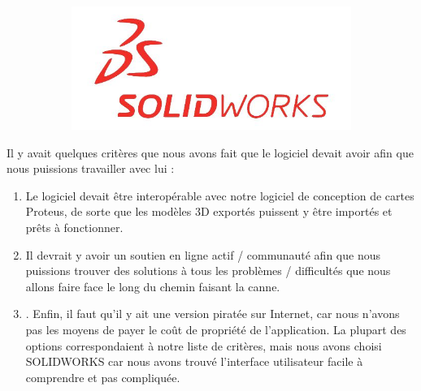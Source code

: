 \begin{figure}[!htbp]
\begin{subfigure}[m]{.22\linewidth}
    \end{subfigure}
    \hfill
    \begin{subfigure}[m]{.22\linewidth}
        \centering
        \includegraphics[width=\textwidth]{assets/conception1/img131.jpg}
    \end{subfigure}
\end{figure}

\FloatBarrier

Il y avait quelques critères que nous avons fait que le logiciel devait avoir afin que nous puissions travailler avec lui :

\begin{enumerate}
    \item Le logiciel devait être interopérable avec notre logiciel de conception de cartes Proteus, de sorte que les modèles 3D exportés puissent y être importés et prêts à fonctionner.
    \item Il devrait y avoir un soutien en ligne actif / communauté afin que nous puissions trouver des solutions à tous les problèmes / difficultés que nous allons faire face le long du chemin faisant la canne.
    \item . Enfin, il faut qu’il y ait une version piratée sur Internet, car nous n’avons pas les moyens de payer le coût de propriété de l’application. La plupart des options correspondaient à notre liste de critères, mais nous avons choisi SOLIDWORKS car nous avons trouvé l’interface utilisateur facile à comprendre et pas compliquée. 
\end{enumerate}

